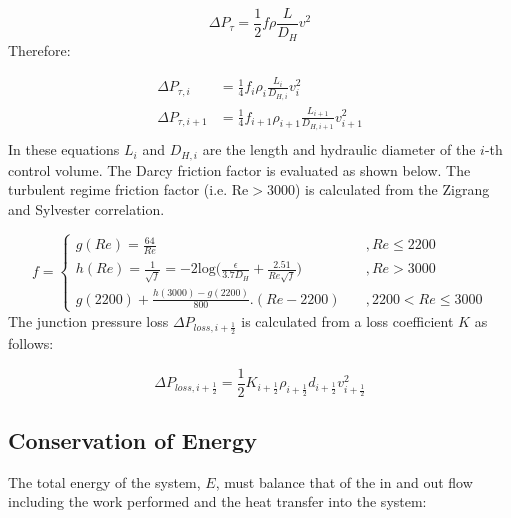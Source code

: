 \documentclass[11pt,letterpaper,titlepage]{article}
\newcommand{\half}{\frac{1}{2}}
\begin{document}
\begin{equation*}
\Delta P_{\tau}=\half f \rho \frac{L}{D_H} v^2
\end{equation*} 
\noindent Therefore:

\begin{equation*}
\begin{aligned}
\Delta P_{\tau,i}&=\frac{1}{4} f_i \rho_i \frac{L_i}{D_{H,i}} v_i^2 \\
\Delta P_{\tau,i+1}&=\frac{1}{4} f_{i+1} \rho_{i+1} \frac{L_{i+1}}{D_{H,i+1}} v_{i+1}^2 \\
\end{aligned}
\end{equation*}
\newline
\noindent
In these equations $L_i$ and $D_{H,i}$ are the length and hydraulic diameter of the $i$-th control volume. The Darcy friction factor is evaluated as shown below. The turbulent regime friction factor (i.e. Re$>$3000) is calculated from the Zigrang and Sylvester correlation.

\begin{equation*}
f=
\begin{cases}
g(Re)=\frac{64}{Re} \quad &,Re\le 2200 \\
h(Re)=\frac{1}{\sqrt{f}}=-2\textrm{log}\biggr( \frac{\epsilon}{3.7D_H}  + \frac{2.51}{Re \sqrt{f}}   \biggr)     \quad &,Re>3000 \\
g(2200)+\frac{h(3000)-g(2200)}{800}. (Re-2200)   \quad &, 2200<Re\le 3000
\end{cases}
\end{equation*}
\newline
The junction pressure loss $\Delta P_{loss,i+\half}$ is calculated from a loss coefficient $K$ as follows:

\begin{equation*}
\Delta P_{loss,i+\half} = \half K_{i+\half} \rho_{i+\half} d_{i+\half} v_{i+\half}^2
\end{equation*}
























\newpage
\subsection{Conservation of Energy}
The total energy of the system, $E$, must balance that of the in and out flow including the work performed and the heat transfer into the system:
\end{document}
